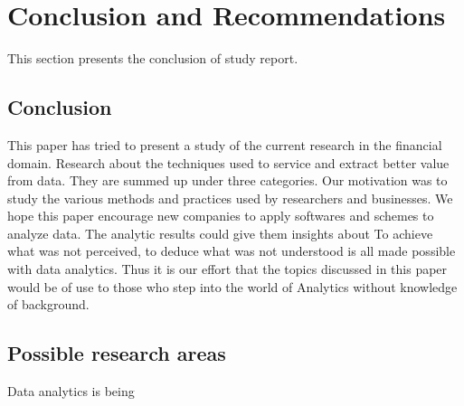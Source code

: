 \setlength{\footskip}{8mm}

\chapter{Conclusion and Recommendations}
\label{ch:conclusion}

This section presents the conclusion of study report.

\section{Conclusion}

This paper has tried to present a study of the current research in the financial domain. Research about the techniques used to service and extract better value from data. They are summed up under three categories. Our motivation was to study the various methods and practices used by researchers and businesses.
We hope this paper encourage new companies to apply softwares and schemes to analyze data. The analytic results could give them insights about
To achieve what was not perceived, to deduce what was not understood is all made possible with data analytics. Thus it is our effort that the topics discussed in this paper would be of use to those who step into the world of Analytics without knowledge of background.

%

\section{Possible research areas}
Data analytics is being 

\FloatBarrier

